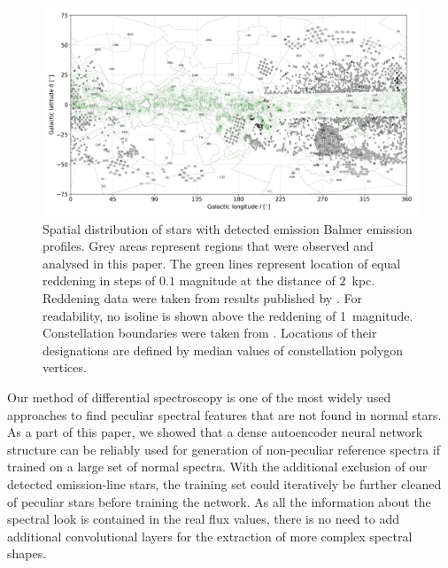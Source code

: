 \begin{figure}
	\centering
	\includegraphics[width=\textwidth]{reddening_d2000_n720_cont_wemisions.png}
	\caption{Spatial distribution of stars with detected emission Balmer emission profiles. Grey areas represent regions that were observed and analysed in this paper. The green lines represent location of equal reddening in steps of $0.1$ magnitude at the distance of $2$~kpc. Reddening data were taken from results published by \citet{2017A&A...606A..65C}. For readability, no isoline is shown above the reddening of 1~magnitude. Constellation boundaries were taken from \citet{const_data}. Locations of their designations are defined by median values of constellation polygon vertices.}
	\label{fig:spatialemission}
\end{figure}

Our method of differential spectroscopy is one of the most widely used approaches to find peculiar spectral features that are not found in normal stars. As a part of this paper, we showed that a dense autoencoder neural network structure can be reliably used for generation of non-peculiar reference spectra if trained on a large set of normal spectra. With the additional exclusion of our detected emission-line stars, the training set could iteratively be further cleaned of peculiar stars before training the network. As all the information about the spectral look is contained in the real flux values, there is no need to add additional convolutional layers for the extraction of more complex spectral shapes. 

